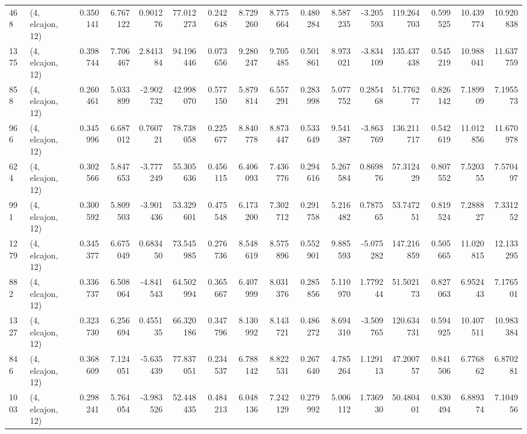 \begin{tabular}{llrrrrrrrrrrrrrr}
468  &  (4, elcajon, 12) &   0.350141 &   6.767122 &   0.901276 &     77.012273 &    0.242648 &    8.729260 &    8.775664 &  0.480284 &   8.587235 &  -3.205593 &   119.264703 &   0.599525 &  10.439774 &  10.920838 \\
1375 &  (4, elcajon, 12) &   0.398744 &   7.706467 &   2.841384 &     94.196446 &    0.073656 &    9.280247 &    9.705485 &  0.501861 &   8.973021 &  -3.834109 &   135.437438 &   0.545219 &  10.988041 &  11.637759 \\
858  &  (4, elcajon, 12) &   0.260461 &   5.033899 &  -2.902732 &     42.998070 &    0.577150 &    5.879814 &    6.557291 &  0.283998 &   5.077752 &   0.285468 &    51.776277 &   0.826142 &   7.189909 &   7.195573 \\
966  &  (4, elcajon, 12) &   0.345996 &   6.687012 &   0.760721 &     78.738058 &    0.225677 &    8.840778 &    8.873447 &  0.533649 &   9.541387 &  -3.863769 &   136.211717 &   0.542619 &  11.012856 &  11.670978 \\
624  &  (4, elcajon, 12) &   0.302566 &   5.847653 &  -3.777249 &     55.305636 &    0.456115 &    6.406093 &    7.436776 &  0.294616 &   5.267584 &   0.869876 &    57.312429 &   0.807552 &   7.520355 &   7.570497 \\
991  &  (4, elcajon, 12) &   0.300592 &   5.809503 &  -3.901436 &     53.329601 &    0.475548 &    6.173200 &    7.302712 &  0.291758 &   5.216482 &   0.787565 &    53.747251 &   0.819524 &   7.288827 &   7.331252 \\
1279 &  (4, elcajon, 12) &   0.345377 &   6.675049 &   0.683450 &     73.545985 &    0.276736 &    8.548619 &    8.575896 &  0.552901 &   9.885593 &  -5.075282 &   147.216859 &   0.505665 &  11.020815 &  12.133295 \\
882  &  (4, elcajon, 12) &   0.336737 &   6.508064 &  -4.841543 &     64.502994 &    0.365667 &    6.407999 &    8.031376 &  0.285856 &   5.110970 &   1.779244 &    51.502173 &   0.827063 &   6.952443 &   7.176501 \\
1327 &  (4, elcajon, 12) &   0.323730 &   6.256694 &   0.455135 &     66.320186 &    0.347796 &    8.130992 &    8.143721 &  0.486272 &   8.694310 &  -3.509765 &   120.634731 &   0.594925 &  10.407511 &  10.983384 \\
846  &  (4, elcajon, 12) &   0.368609 &   7.124051 &  -5.635439 &     77.837051 &    0.234537 &    6.788142 &    8.822531 &  0.267640 &   4.785264 &   1.129113 &    47.200757 &   0.841506 &   6.776862 &   6.870281 \\
1003 &  (4, elcajon, 12) &   0.298241 &   5.764054 &  -3.983526 &     52.448435 &    0.484213 &    6.048136 &    7.242129 &  0.279992 &   5.006112 &   1.736930 &    50.480401 &   0.830494 &   6.889374 &   7.104956 \\

\end{tabular}
